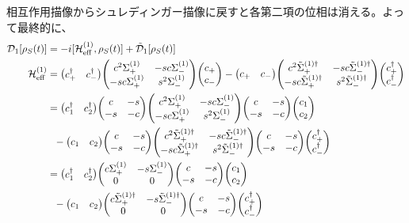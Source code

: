 \documentclass[dvipdfmx,autodetect-engine]{jsarticle}
\newcommand{\da}{\dagger}
\newcommand{\m}[1]{\mathcal{#1}}
\newcommand{\mr}[1]{\mathrm{#1}}
\begin{document}
相互作用描像からシュレディンガー描像に戻すと各第二項の位相は消える。よって最終的に、
\begin{align}
    \m{D}_1[\rho_S(t)] &= -i[\m{H}^{(1)}_{\mr{eff}}, \rho_S(t)] + \tilde{\m{D}}_1[\rho_S(t)]\\
    \m{H}^{(1)}_{\mr{eff}} &= \mqty(c^\da_+ & c^\da_-) \mqty(c^2 \Sigma^{(1)}_+ & -sc \Sigma^{(1)}_- \\ -sc \Sigma^{(1)}_+ & s^2 \Sigma^{(1)}_-)\mqty(c_+ \\ c_-) - \mqty(c_+ & c_-) \mqty(c^2 \tilde{\Sigma}^{(1)\da}_+ & -sc \tilde{\Sigma}^{(1)\da}_- \\ -sc \tilde{\Sigma}^{(1)\da}_+ & s^2 \tilde{\Sigma}^{(1)\da}_-)\mqty(c^\da_+ \\ c^\da_-)\\
    &= \mqty(c^\da_1 & c^\da_2)\mqty(c & -s \\ -s & -c) \mqty(c^2 \Sigma^{(1)}_+ & -sc \Sigma^{(1)}_- \\ -sc \Sigma^{(1)}_+ & s^2 \Sigma^{(1)}_-)\mqty(c & -s \\ -s & -c)\mqty(c_1 \\ c_2)\nonumber\\
    & \ \ - \mqty(c_1 & c_2)\mqty(c & -s \\ -s & -c) \mqty(c^2 \tilde{\Sigma}^{(1)\da}_+ & -sc \tilde{\Sigma}^{(1)\da}_- \\ -sc \tilde{\Sigma}^{(1)\da}_+ & s^2 \tilde{\Sigma}^{(1)\da}_-)\mqty(c & -s \\ -s & -c)\mqty(c^\da_+ \\ c^\da_-)\\
    &= \mqty(c^\da_1 & c^\da_2)\mqty(c \Sigma^{(1)}_+ & -s\Sigma^{(1)}_- \\ 0 & 0 )\mqty(c & -s \\ -s & -c)\mqty(c_1 \\ c_2)\nonumber\\
    & \ \ - \mqty(c_1 & c_2)\mqty(c \tilde{\Sigma}^{(1)\da}_+ & -s \tilde{\Sigma}^{(1)\da}_- \\ 0 & 0)\mqty(c & -s \\ -s & -c)\mqty(c^\da_+ \\ c^\da_-)\\
\end{align}
\end{document}

